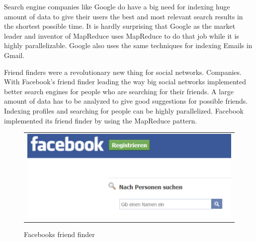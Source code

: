 Search engine companies like Google do have a big need for indexing huge amount of data to give
their users the best and most relevant search results in the shortest possible time. It is hardly
surprising that Google as the market leader and inventor of MapReduce uses MapReduce to do that job
while it is highly parallelizable. Google also uses the same techniques for indexing Emails in
Gmail.

Friend finders were a revolutionary new thing for social networks. Companies.  With Facebook’s
friend finder leading the way big social networks implemented better search engines for people who
are searching for their friends. A large amount of data has to be analyzed to give good suggestions
for possible friends. Indexing profiles and searching for people can be highly parallelized.
Facebook implemented its friend finder by using the MapReduce pattern.

\begin{figure} [!htb]
	\begin{center}
		  \begin{tabular}{@{}r@{}}
		{\includegraphics[width=14cm]{images/FacebookfriendFinder.png}}\\
 	 	 \end{tabular}
		\caption{Facebooks friend finder}
		\label{fig:friendFinder}
	\end{center}
\end{figure}
